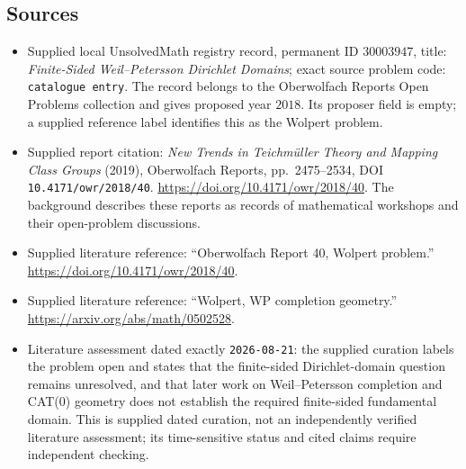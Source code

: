 \documentclass[11pt]{article}
\begin{document}
\subsection{Sources}
\begin{itemize}
\item Supplied local UnsolvedMath registry record, permanent ID \(30003947\), title: \emph{Finite-Sided Weil--Petersson Dirichlet Domains}; exact source problem code: \texttt{catalogue entry}. The record belongs to the Oberwolfach Reports Open Problems collection and gives proposed year \(2018\). Its proposer field is empty; a supplied reference label identifies this as the Wolpert problem.
\item Supplied report citation: \emph{New Trends in Teichm\"uller Theory and Mapping Class Groups} (2019), Oberwolfach Reports, pp.\ 2475--2534, DOI \texttt{10.4171/owr/2018/40}. \url{https://doi.org/10.4171/owr/2018/40}. The background describes these reports as records of mathematical workshops and their open-problem discussions.
\item Supplied literature reference: ``Oberwolfach Report 40, Wolpert problem.'' \url{https://doi.org/10.4171/owr/2018/40}.
\item Supplied literature reference: ``Wolpert, WP completion geometry.'' \url{https://arxiv.org/abs/math/0502528}.
\item Literature assessment dated exactly \texttt{2026-08-21}: the supplied curation labels the problem open and states that the finite-sided Dirichlet-domain question remains unresolved, and that later work on Weil--Petersson completion and CAT(0) geometry does not establish the required finite-sided fundamental domain. This is supplied dated curation, not an independently verified literature assessment; its time-sensitive status and cited claims require independent checking.
\end{itemize}
\end{document}
